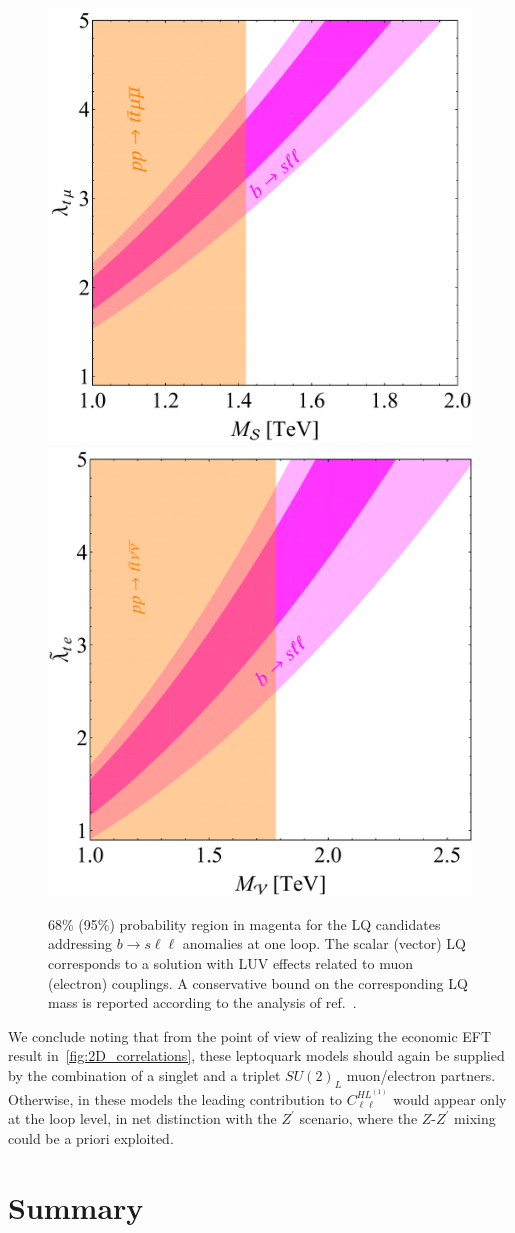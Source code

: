 \begin{figure}[tp]
	\centering 
	\includegraphics[width=0.45\linewidth]{figures/Scalar_LQ.pdf}
	\includegraphics[width=0.435\linewidth]{figures/Vector_LQ.pdf}
	\caption{68\% (95\%) probability region in magenta for the LQ candidates addressing $b \to s \ell \ell$ anomalies at one loop. The scalar (vector) LQ corresponds to a solution with LUV effects related to muon (electron) couplings. A conservative bound on the corresponding LQ mass is reported according to the analysis of ref.~\cite{Angelescu:2018tyl}.}    
	\label{fig:LQ_constraints}
\end{figure}

We conclude noting that from the point of view of realizing the economic EFT result in~\autoref{fig:2D_correlations}, these leptoquark models should again be supplied by the combination of a singlet and a triplet $SU(2)_{L}$ muon/electron partners. Otherwise, in these models the leading contribution to $C^{HL^{(1)}}_{\ell\ell}$ would appear only at the loop level, in net distinction with the $Z^{\prime}$ scenario, where the $Z$-$Z^{\prime}$ mixing could be a priori exploited.

\section{Summary}
\label{sec:sum}

